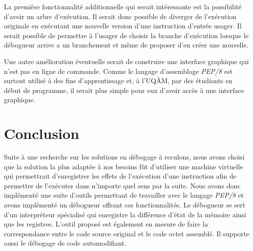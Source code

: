 \documentclass{article}
\begin{document}
La première fonctionnalité additionnelle qui serait intéressante est la
possibilité d'avoir un arbre d'exécution. Il serait donc possible de
diverger de l'exécution originale en exécutant une nouvelle version
d'une instruction d'entrée usager. Il serait possible de permettre à
l'usager de choisir la branche d'exécution lorsque le débogueur arrive a
un branchement et même de proposer d'en créer une nouvelle.

Une autre amélioration éventuelle serait de construire une interface
graphique qui n'est pas en ligne de commande. Comme le langage
d'assemblage \emph{PEP/8} est surtout utilisé à des fins d'apprentissage
et, à l'UQÀM, par des étudiants en début de programme, il serait plus
simple pour eux d'avoir accès à une interface graphique.

\section{Conclusion}\label{conclusion}

Suite à une recherche sur les solutions en débogage à reculons, nous
avons choisi que la solution la plus adaptée à nos besoins fût
d'utiliser une machine virtuelle qui permettrait d'enregistrer les
effets de l'exécution d'une instruction afin de permettre de l'exécuter
dans n'importe quel sens par la suite. Nous avons donc implémenté une
suite d'outils permettant de travailler avec le langage \emph{PEP/8} et
avons implémenté un débogueur offrant ces fonctionnalités. Le débogueur
se sert d'un interpréteur spécialisé qui enregistre la différence d'état
de la mémoire ainsi que les registres. L'outil proposé est également en
mesure de faire la correspondance entre le code source original et le
code octet assemblé. Il supporte aussi le débogage de code
automodifiant.

{}

\end{document}
